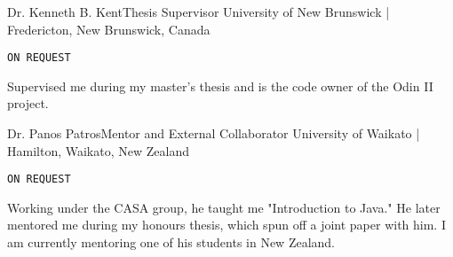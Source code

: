 \documentclass{developercv} %
\begin{document}
\ifdefined{} \fi


\entrys%
{Dr. Kenneth B. Kent}{Thesis Supervisor}
{University of New Brunswick | Fredericton, New Brunswick, Canada}
{\texttt{ON REQUEST}

	Supervised me during my master's thesis and is the code owner of the Odin II project.
}

\entrys%
{Dr. Panos Patros}{Mentor and External Collaborator}
{University of Waikato | Hamilton, Waikato, New Zealand}
{\texttt{ON REQUEST}

	Working under the CASA group, he taught me "Introduction to Java."
	He later mentored me during my honours thesis, which spun off a joint paper with him.
	I am currently mentoring one of his students in New Zealand.
}
\end{document}
